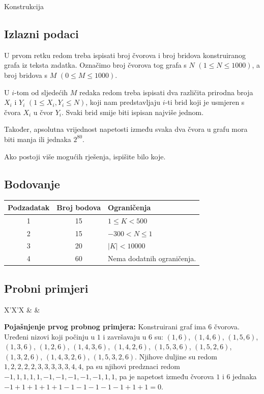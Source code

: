 \begin{statement}[
  problempoints=110,
  timelimit=1 sekunda,
  memorylimit=512 MiB,
]{Konstrukcija}
\subsection*{Izlazni podaci}
U prvom retku redom treba ispisati broj čvorova i broj bridova konstruiranog
grafa iz teksta zadatka. Označimo broj čvorova tog grafa s $N$ $(1 \le N \le
1000)$, a broj bridova s $M$ $(0 \le M \le 1000)$.

U $i$-tom od sljedećih $M$ redaka redom treba ispisati dva različita prirodna
broja $X_i$ i $Y_i$ $(1 \le X_i, Y_i \le N)$, koji nam predstavljaju $i$-ti
brid koji je usmjeren s čvora $X_i$ u čvor $Y_i$. Svaki brid smije biti
ispisan najviše jednom.

Također, apsolutna vrijednost napetosti između svaka dva čvora u grafu mora
biti manja ili jednaka $2^{80}$.

Ako postoji više mogućih rješenja, ispišite bilo koje.

\subsection*{Bodovanje}
{\renewcommand{\arraystretch}{1.4}
  \setlength{\tabcolsep}{6pt}
  \begin{tabular}{ccl}
 Podzadatak & Broj bodova & Ograničenja \\ \midrule
  1 & 15 & $1 \le K < 500$ \\
  2 & 15 & $-300 < N \le 1$ \\
  3 & 20 & $|K| < 10000$\\
  4 & 60 & Nema dodatnih ograničenja. \\
\end{tabular}}

\subsection*{Probni primjeri}
\begin{tabularx}{\textwidth}{X'X'X}
 &
 &
\end{tabularx}

\textbf{Pojašnjenje prvog probnog primjera:}
Konstruirani graf ima $6$ čvorova. Uređeni nizovi koji počinju u $1$ i
završavaju u $6$ su: $(1, 6)$, $(1, 4, 6)$, $(1, 5, 6)$, $(1, 3, 6)$, $(1, 2,
6)$, $(1, 4, 3, 6)$, $(1, 4, 2, 6)$, $(1, 5, 3, 6)$, $(1, 5, 2, 6)$, $(1, 3, 2,
6)$, $(1, 4, 3, 2, 6)$, $(1, 5, 3, 2, 6)$.  Njihove duljine su redom $1, 2, 2,
2, 2, 3, 3, 3, 3, 3, 4, 4$, pa su njihovi predznaci redom $-1, 1, 1, 1, 1, -1,
-1, -1, -1, -1, 1, 1$, pa je napetost između čvorova $1$ i $6$ jednaka $-1 + 1
+ 1 + 1 + 1 - 1 - 1 - 1 - 1 - 1 + 1 + 1 = 0$.


\end{statement}
